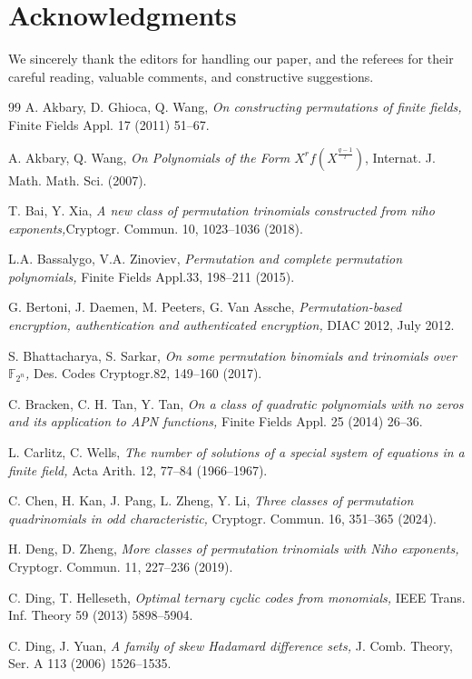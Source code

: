 \documentclass[12pt]{amsart}
\numberwithin{equation}{section}
\theoremstyle{definition}
\newcommand{\F}{\mathbb F}
\begin{document}
\section*{Acknowledgments}
We sincerely thank the editors for handling our paper, and the referees for their careful reading, valuable comments, and constructive suggestions.

\begin{thebibliography}{99}
 A. Akbary, D. Ghioca, Q. Wang, {\it On constructing permutations of finite fields,} Finite Fields Appl. 17 (2011) 51--67.

 A. Akbary, Q. Wang, {\it On Polynomials of the Form $X^rf(X^{\frac{q-1}{l}})$}, Internat. J. Math. Math. Sci. (2007).

 T. Bai, Y. Xia, {\it A new class of permutation trinomials constructed from niho exponents,}Cryptogr. Commun. 10, 1023--1036 (2018).

 L.A. Bassalygo, V.A. Zinoviev, {\it Permutation and complete permutation polynomials,} Finite Fields Appl.33, 198--211 (2015).

 G. Bertoni, J. Daemen, M. Peeters, G. Van Assche, {\it Permutation-based encryption, authentication and authenticated encryption,} DIAC 2012, July 2012.

 S. Bhattacharya, S. Sarkar, {\it On some permutation binomials and trinomials over $\F_{2^n}$,} Des. Codes Cryptogr.82, 149--160 (2017).

 C. Bracken, C. H. Tan, Y. Tan, {\it On a class of quadratic polynomials with no zeros and its application to APN functions,} Finite Fields Appl. 25 (2014) 26--36.


 L. Carlitz, C. Wells, {\it The number of solutions of a special system of equations in a finite field,} Acta Arith. 12, 77--84 (1966–1967).

 C. Chen, H. Kan, J. Pang, L. Zheng, Y. Li, {\it Three classes of permutation quadrinomials in odd characteristic,} Cryptogr. Commun. 16, 351--365 (2024).

 H. Deng, D. Zheng, {\it More classes of permutation trinomials with Niho exponents,} Cryptogr. Commun. 11, 227--236 (2019).

  C. Ding, T. Helleseth, {\it Optimal ternary cyclic codes from monomials,} IEEE Trans. Inf. Theory 59 (2013) 5898--5904.

  C. Ding, J. Yuan, {\it A family of skew Hadamard difference sets,} J. Comb. Theory, Ser. A 113 (2006) 1526--1535.


\end{thebibliography}
\end{document}
